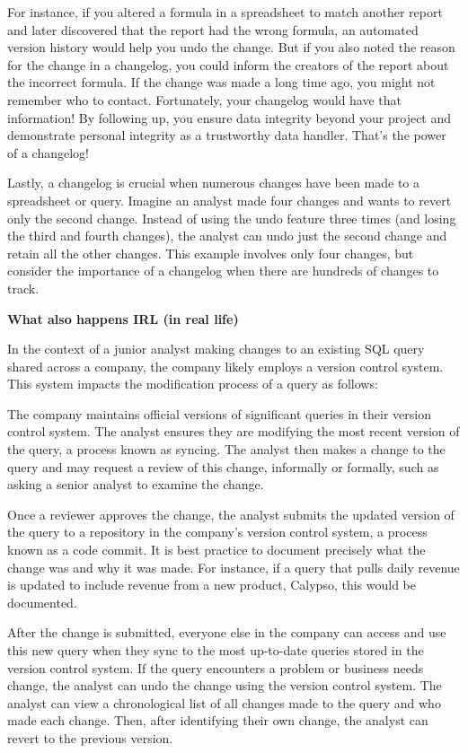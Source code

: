 \documentclass[]{article}
\begin{document}
For instance, if you altered a formula in a spreadsheet to match another report and later discovered that the report had the wrong formula, an automated version history would help you undo the change. But if you also noted the reason for the change in a changelog, you could inform the creators of the report about the incorrect formula. If the change was made a long time ago, you might not remember who to contact. Fortunately, your changelog would have that information! By following up, you ensure data integrity beyond your project and demonstrate personal integrity as a trustworthy data handler. That's the power of a changelog!

Lastly, a changelog is crucial when numerous changes have been made to a spreadsheet or query. Imagine an analyst made four changes and wants to revert only the second change. Instead of using the undo feature three times (and losing the third and fourth changes), the analyst can undo just the second change and retain all the other changes. This example involves only four changes, but consider the importance of a changelog when there are hundreds of changes to track.

\textbf{What also happens IRL (in real life)}

In the context of a junior analyst making changes to an existing SQL query shared across a company, the company likely employs a version control system. This system impacts the modification process of a query as follows:

The company maintains official versions of significant queries in their version control system. The analyst ensures they are modifying the most recent version of the query, a process known as syncing. The analyst then makes a change to the query and may request a review of this change, informally or formally, such as asking a senior analyst to examine the change.

Once a reviewer approves the change, the analyst submits the updated version of the query to a repository in the company’s version control system, a process known as a code commit. It is best practice to document precisely what the change was and why it was made. For instance, if a query that pulls daily revenue is updated to include revenue from a new product, Calypso, this would be documented.

After the change is submitted, everyone else in the company can access and use this new query when they sync to the most up-to-date queries stored in the version control system. If the query encounters a problem or business needs change, the analyst can undo the change using the version control system. The analyst can view a chronological list of all changes made to the query and who made each change. Then, after identifying their own change, the analyst can revert to the previous version.
\end{document}
